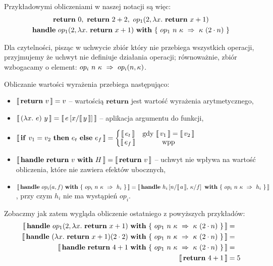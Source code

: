 \documentclass[shortabstract]{iithesis}
\begin{document}
Przykładowymi obliczeniami w naszej notacji są więc:
\begin{equation*}
\begin{gathered}
  \return{0},\ \return{2 + 2},\ \op{1}{2}{\fun{x}{\return{x + 1}}} \\
  \handle{\op{1}{2}{\fun{x}{\return{x + 1}}}}{\{\ \hcase{op_1}{n\ \kappa}{\kappa\ (2 \cdot n)} \ \}}
\end{gathered}
\end{equation*}

Dla czytelności, pisząc w uchwycie zbiór który nie przebiega wszystkich operacji, przyjmujemy że uchwyt nie definiuje działania operacji; równoważnie, zbiór wzbogacamy o element: \(op_i\ n\ \kappa\ \Rightarrow\ op_i(n, \kappa)\).

Obliczanie wartości wyrażenia przebiega następująco:
\begin{itemize}
\item \(\llbracket\, \mathbf{return}\ v\, \rrbracket = v\) -- wartością \(\mathbf{return}\) jest wartość wyrażenia arytmetycznego,
\item \(\llbracket\, (\lambda x.\ e)\ y\, \rrbracket = \llbracket\, e \left[x / \llbracket\, y\, \rrbracket\right]\, \rrbracket\) -- aplikacja argumentu do funkcji,
\item
  \(\begin{aligned}[t]
    \llbracket\, \mathbf{if}\ v_1 = v_2\ \mathbf{then}\ e_t\ \mathbf{else}\ e_f\, \rrbracket = \left\{\begin{matrix}
    \llbracket\, e_t\, \rrbracket & \text{gdy }\llbracket\, v_1\, \rrbracket = \llbracket\, v_2\, \rrbracket \\ 
    \llbracket\, e_f\, \rrbracket & \text{wpp}
    \end{matrix}\right.
  \end{aligned}\)
\item \(\llbracket\, \mathbf{handle}\ \mathbf{return}\ v\ \mathbf{with}\ H\, \rrbracket = \llbracket\, \mathbf{return}\ v\, \rrbracket\) -- uchwyt nie wpływa na wartość obliczenia, które nie zawiera efektów ubocznych,
\item \(\eval{\handle{\op{i}{a}{f}}{\{\ \hcase{op_i}{n\ \kappa}{h_i} \ \}}} =
  \eval{\handle{h_i \left[n / \eval{a},\, \kappa / f\right]}{\{\ \hcase{op_i}{n\ \kappa}{h_i} \ \}}} \), przy czym \(h_i\) nie ma wystąpień \(op_i\).
  
\end{itemize}

Zobaczmy jak zatem wygląda obliczenie ostatniego z powyższych przykładów:
\begin{align*}
  \eval{\handle{\op{1}{2}{\fun{x}{\return{x + 1}}}}{\{\ \hcase{op_1}{n\ \kappa}{\kappa\ (2 \cdot n)} \ \}}} &= \\
  \eval{\handle{(\fun{x}{\return{x+1}}) (2 \cdot 2)}{\{\ \hcase{op_1}{n\ \kappa}{\kappa\ (2 \cdot n)} \ \}}} &= \\
  \eval{\handle{\return{4+1}}{\{\ \hcase{op_1}{n\ \kappa}{\kappa\ (2 \cdot n)} \ \}}} &= \\
  \eval{\return{4 + 1}} &= 5
\end{align*}
\end{document}

